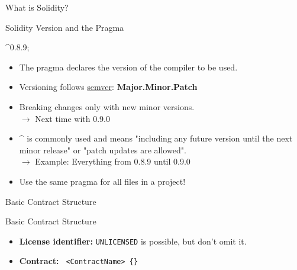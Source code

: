 \documentclass[handout]{beamer}
\begin{document}
\begin{frame}{What is Solidity?}
\vspace{1em}
	

\end{frame}


\begin{frame}{Solidity Version and the Pragma}

 \^{}0.8.9;	

\vspace{1em}

	\begin{itemize}
		\item<1-> The pragma declares the version of the compiler to be used.
 		\item<2-> Versioning follows \link \href{https://semver.org/}{semver}: \textbf{Major.Minor.Patch}
 		\item<3-> Breaking changes only with new minor versions. \\ {\small $\rightarrow$ Next time with 0.9.0}
		\item<4->  \^{} is commonly used and means "including any future version until the next minor release" or "patch updates are allowed". \\
 {$\rightarrow$ \small Example: Everything from 0.8.9 until 0.9.0}
 		\item<5-> Use the same pragma for all files in a project!
	\end{itemize}
	
\end{frame}


\begin{frame}{Basic Contract Structure}

	\begin{samplecode}{Basic Contract Structure}
		
	\end{samplecode}
	\vspace{1em}
	\begin{itemize}
		\item \textbf{License identifier:} \texttt{UNLICENSED} is possible, but don't omit it.
		\item \textbf{Contract:} \texttt{ <ContractName> \{\}}
	\end{itemize}

\end{frame}
\end{document}
